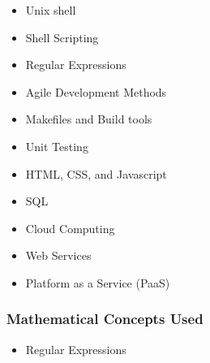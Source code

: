 {\begin{highlight}[\CSPBSoftDev]
        \begin{itemize}
            \item Unix shell
            \item Shell Scripting
            \item Regular Expressions
            \item Agile Development Methods
            \item Makefiles and Build tools
            \item Unit Testing
            \item HTML, CSS, and Javascript
            \item SQL
            \item Cloud Computing
            \item Web Services
            \item Platform as a Service (PaaS)
        \end{itemize}
        
        \subsubsection*{Mathematical Concepts Used}
    
        \begin{itemize}
            \item Regular Expressions
        \end{itemize}
    \end{highlight}
}